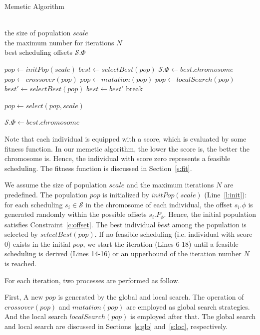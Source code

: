 \documentclass[journal]{IEEEtran}
\newcommand{\calS}{\mathcal{S}}
\theoremstyle{remark}
\begin{document}
\begin{algorithm}[tb]
	\caption{Memetic Algorithm}
	\label{a:alg}
	\renewcommand{\algorithmicrequire}{\textbf{Input:}}
	\renewcommand{\algorithmicensure}{\textbf{Output:}}
	\begin{algorithmic}[1]
		\REQUIRE~~\\
		the size of population $scale$\\
		the maximum number for iterations $N$
		\ENSURE~~\\
		best scheduling offsets $\calS.\Phi$
		
		\STATE $pop \gets initPop(scale)$ \label{l:init}
		\STATE $best \gets selectBest(pop)$
		\RETURN $\calS.\Phi \gets best.chromosome$
		\ENDIF
		\STATE $pop \gets crossover(pop)$
		\STATE $pop \gets mutation(pop)$
		\STATE $pop \gets localSearch(pop)$
		\STATE $best' \gets selectBest(pop)$
		\STATE $best \gets best'$
		\ENDIF    
		\STATE break
		\ENDIF
		
		\STATE $pop \gets select(pop, scale)$
		\ENDFOR
		
		\RETURN $\calS.\Phi \gets best.chromosome$
	\end{algorithmic}
\end{algorithm}	

Note that each individual is equipped with a score, which is evaluated by some fitness function.
In our memetic algorithm,
 the lower the score is, the better the chromosome is.
Hence,
 the individual with score zero represents a feasible scheduling.
The fitness function is discussed in Section~\ref{s:fit}.

We assume the size of population $scale$ and the maximum iterations $N$ are predefined.
The population $pop$ is initialized by $initPop(scale)$ (Line~\ref{l:init}):
for each scheduling $s_{i}\in\calS$ in the chromosome of each individual,
 the offset $s_i.\phi$ is generated randomly within the possible offsets $s_i.P_\phi$.
Hence,
 the initial population satisfies Constraint~\ref{c:offset}.
The best individual $best$ among the population is selected by $selectBest(pop)$.
If no feasible scheduling (i.e. individual with score 0) exists in the initial $pop$, 
we start the iteration (Lines 6-18) until a feasible scheduling is derived (Lines 14-16) or an upperbound of the iteration number $N$ is reached.

For each iteration, two processes are performed as follow.

First, A new $pop$ is generated by the global and local search.
The operation of $crossover(pop)$ and $mutation(pop)$ are employed as global search strategies.
And the local search $localSearch(pop)$ is employed after that.
The global search and local search are discussed in Sections~\ref{s:glo} and~\ref{s:loc}, respectively.
\end{document}
